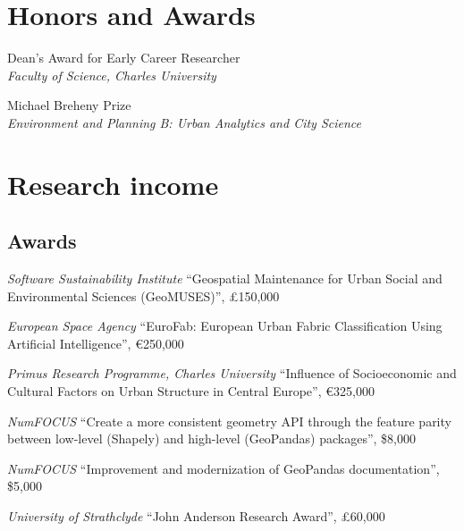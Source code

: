 \documentclass[12pt,a4paper]{report}
\begin{document}
    \section*{Honors and Awards}

    \begin{tablist}

        \item[2024] \tab{}Dean's Award for Early Career Researcher \\
            \textit{Faculty of Science, Charles University}
        \item[2023] \tab{}Michael Breheny Prize \\
                    \textit{Environment and Planning B: Urban Analytics and City Science}

    \end{tablist}

    \section*{Research income}

    \subsection*{Awards}

    \begin{tablist}

        \item[2026] \tab{}\textit{Software Sustainability Institute} \enquote{Geospatial Maintenance for Urban Social and Environmental Sciences (GeoMUSES)}, £150,000
        \item[2024] \tab{}\textit{European Space Agency} \enquote{EuroFab: European Urban Fabric Classification Using Artificial Intelligence}, €250,000
        \item[2023] \tab{}\textit{Primus Research Programme, Charles University} \enquote{Influence of Socioeconomic and Cultural Factors on Urban Structure in Central Europe}, €325,000
        \item[2023] \tab{}\textit{NumFOCUS} \enquote{Create a more consistent geometry API through the feature parity between low-level (Shapely) and high-level (GeoPandas) packages}, \$8,000
        \item[2020] \tab{}\textit{NumFOCUS} \enquote{Improvement and modernization of GeoPandas documentation}, \$5,000
        \item[2018] \tab{}\textit{University of Strathclyde} \enquote{John Anderson Research Award}, £60,000

    \end{tablist}
\end{document}
